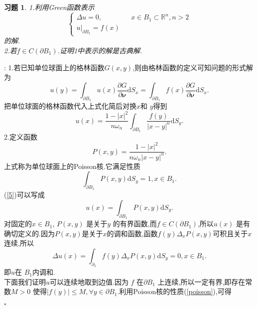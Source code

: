 \documentclass[a4paper]{article}
\newcommand\R{\ensuremath{\mathbb{R}}}
\newtheorem*{exe}{习题}
\newenvironment{sol}{{\noindent\bfseries 解}:}{\hfill $\square$\par}
\begin{document}
\begin{exe}
  1.利用Green函数表示
  \begin{equation}
    \left\{\begin{array}{lcr}
      \Delta u=0, && x\in  B_1\subset \R^n, n>2\\
      u\lvert_{\partial B_1}=f(x)
    \end{array}\right.
  \end{equation}
  的解.\\
  2.若$f\in C(\partial B_1)$.证明1中表示的解是古典解.
\end{exe}
\begin{sol}
  1.若已知单位球面上的格林函数$G(x,y)$,则由格林函数的定义可知问题的形式解为
   \begin{equation}
     u(y)=\int_{\partial B_1}u(x) \frac{\partial G}{\partial \mathbf{\nu}}\mathrm{d}S_x=\int_{\partial B_1} f(x) \frac{\partial G}{\partial\mathbf{\nu}}\mathrm{d}S_x.\label{4}
  \end{equation}
  把单位球面的格林函数代入上式化简后对换$x$和 $y$得到
  \begin{equation}
    u(x)=\frac{1-\left| x \right|^2 }{n\omega_n}\int_{\partial B_1}\frac{f(y)}{\left| x-y \right| ^n}\mathrm{d}S_y.\label{5}
  \end{equation}
  2.定义函数
  \begin{equation}
    P(x,y)=\frac{1-\left| x \right| ^2}{n\omega_n\left| x-y \right| ^n}.
  \end{equation}
  上式称为单位球面上的Poisson核.它满足性质
  \begin{equation}
    \int_{\partial B_1}P(x,y)\mathrm{d}S_y=1, x\in B_{1}.\label{poisson}
  \end{equation}
  (\ref{5})可以写成
  \begin{equation}
    u(x)=\int_{\partial B_1}P(x,y)\mathrm{d}S_y.\label{integral}
  \end{equation}
  对固定的$x\in B_1$, $P(x,y)$ 是关于$y$ 的有界函数,而$f\in C\left( \partial B_1 \right) $,所以$u(x)$ 是有确切定义的.因为$P(x,y)$是关于$x$的调和函数,函数$f(y)\Delta_x P(x,y)$可积且关于$x$连续,所以
  \begin{equation}
    \Delta u(x)=\int_{\partial_1}f(y)\Delta_x P(x,y)\mathrm{d}S_y=0,x\in  B_1.
  \end{equation}
  即$u$在 $B_1$内调和.\\
  下面我们证明$u$可以连续地取到边值.因为 $f$ 在$\partial B_1$ 上连续,所以一定有界,即存在常数$M>0$ 使得$\left| f(y) \right| \le M, \forall y\in \partial B_1$.利用Poisson核的性质(\ref{poisson}),可得

\end{sol}
\end{document}
